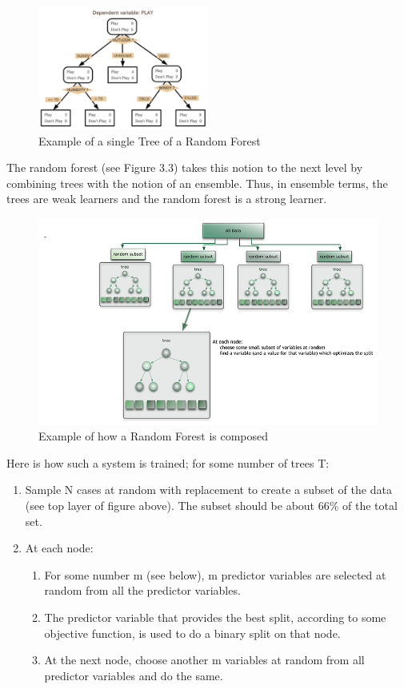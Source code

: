 \begin{figure}
\centering
\includegraphics[width=0.5\textwidth]{img/rf_2.jpg}
\caption{Example of a single Tree of a Random Forest}
\label{}
\end{figure}

The random forest (see Figure 3.3) takes this notion to the next level by combining trees with the notion of an ensemble. Thus, in ensemble terms, the trees are weak learners and the random forest is a strong learner.

\begin{figure}
\centering
    \includegraphics[width=0.7\columnwidth]{img/random_forest_small.jpg}
    \caption{Example of how a Random Forest is composed}
    \label{Fig.4}
\end{figure}

Here is how such a system is trained; for some number of trees T:
\begin{enumerate}
\item Sample N cases at random with replacement to create a subset of the data (see top layer of figure above). The subset should be about 66\% of the total set.
\item At each node:
\begin{enumerate}
\item For some number m (see below), m predictor variables are selected at random from all the
predictor variables.
\item The predictor variable that provides the best split, according to some objective function, is
used to do a binary split on that node.
\item  At the next node, choose another m variables at random from all predictor variables and do
the same.
\end{enumerate}
\end{enumerate}

